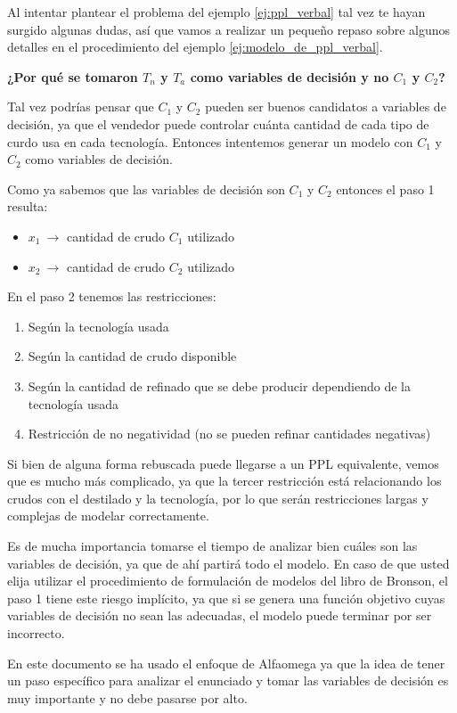 Al intentar plantear el problema del ejemplo \ref{ej:ppl_verbal} tal vez te hayan surgido algunas dudas, así que vamos a realizar un pequeño repaso sobre algunos detalles en el procedimiento del ejemplo \ref{ej:modelo_de_ppl_verbal}.

\noindent\textbf{¿Por qué se tomaron \(T_n\) y \(T_a\) como variables de decisión y no \(C_1\) y \(C_2\)?}

Tal vez podrías pensar que \(C_1\) y \(C_2\) pueden ser buenos candidatos a variables de decisión, ya que el vendedor puede controlar cuánta cantidad de cada tipo de curdo usa en cada tecnología. Entonces intentemos generar un modelo con \(C_1\) y \(C_2\) como variables de decisión.

Como ya sabemos que las variables de decisión son \(C_1\) y \(C_2\) entonces el paso 1 resulta:
\begin{itemize}
  \item \(x_1 ~\rightarrow\) cantidad de crudo \(C_1\) utilizado
  \item \(x_2 ~\rightarrow\) cantidad de crudo \(C_2\) utilizado
\end{itemize}

\noindent En el paso 2 tenemos las restricciones:
\begin{enumerate}
  \item Según la tecnología usada
  \item Según la cantidad de crudo disponible
  \item Según la cantidad de refinado que se debe producir dependiendo de la tecnología usada
  \item Restricción de no negatividad (no se pueden refinar cantidades negativas)
\end{enumerate}
Si bien de alguna forma rebuscada puede llegarse a un PPL equivalente, vemos que es mucho más complicado, ya que la tercer restricción está relacionando los crudos con el destilado y la tecnología, por lo que serán restricciones largas y complejas de modelar correctamente.

Es de mucha importancia tomarse el tiempo de analizar bien cuáles son las variables de decisión, ya que de ahí partirá todo el modelo. En caso de que usted elija utilizar el procedimiento de formulación de modelos del libro de Bronson, el paso 1 tiene este riesgo implícito, ya que si se genera una función objetivo cuyas variables de decisión no sean las adecuadas, el modelo puede terminar por ser incorrecto.

En este documento se ha usado el enfoque de Alfaomega ya que la idea de tener un paso específico para analizar el enunciado y tomar las variables de decisión es muy importante y no debe pasarse por alto.

